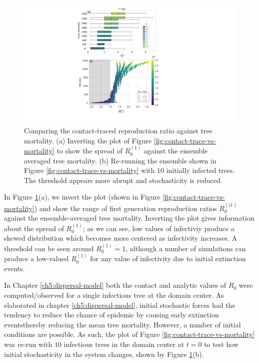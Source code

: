 \begin{figure}
    \centering
    \includegraphics[scale=0.60]{chapter5/figures/fig6-R0-contact-vs-mortality-A.pdf}
    \caption{Comparing the contact-traced reproduction ratio against tree mortality. (a) Inverting the plot of Figure \ref{fig:contact-trace-vs-mortality} to show the spread of $R_0^{(1)}$ against the ensemble averaged tree mortality. (b)
    Re-running the ensemble shown in Figure \ref{fig:contact-trace-vs-mortality} with $10$ initially infected trees. The threshold appears more abrupt and stochasticity is reduced.}
    \label{fig:R0-contact-vs-morality-A}
\end{figure}

In Figure \ref{fig:R0-contact-vs-morality-A}(a), we invert the plot (shown in Figure \ref{fig:contact-trace-vs-mortality}) and show the range of first generation reproduction ratios $R_0^{(i1)}$ against the ensemble-averaged tree mortality.
Inverting the plot gives information about the spread of $R_0^{(1)}$;
as we can see, low values of infectiviy produce a skewed distribution which becomes more centered as infectivity increases.
A threshold can be seen around $R_0^{(1)}=1$, although a number of simulations can produce a low-valued $R_0^{(1)}$ for any value of infectivity due to initial extinction events.

In Chapter \ref{ch5:dispersal-model} both the contact and analytic values of $R_0$ were computed/observed for a single infectious tree at the domain center.
As elaborated in chapter \ref{ch5:dispersal-model}, initial stochastic forces had the tendency to reduce the chance of epidemic by causing early extinction events\textemdash thereby reducing the mean tree mortality.
However, a number of initial conditions are possible.
As such, the plot of Figure \ref{fig:contact-trace-vs-mortality} was re-run with $10$ infectious trees in the domain center at $t=0$ to test how initial stochasticity in the system changes, shown by Figure \ref{fig:R0-contact-vs-morality-A}(b).

